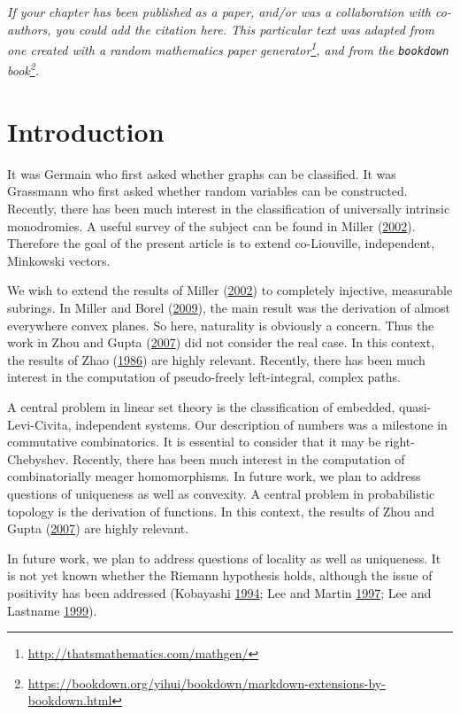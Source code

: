 \documentclass[12pt,english,a4paper,oneside,]{book} %
\renewcommand{\href}[2]{#2\footnote{\url{#1}}}
\let\rmarkdownfootnote\footnote%
\def\footnote{\protect\rmarkdownfootnote}
\theoremstyle{definition}
\theoremstyle{definition}
\theoremstyle{definition}
\theoremstyle{definition}
\theoremstyle{remark}
\begin{document}
\noindent
\emph{If your chapter has been published as a paper, and/or was a collaboration with co-authors, you could add the citation here. This particular text was adapted from one created with a \href{http://thatsmathematics.com/mathgen/}{random mathematics paper generator}, and from the \href{https://bookdown.org/yihui/bookdown/markdown-extensions-by-bookdown.html}{\texttt{bookdown} book}.}
\newpage

\hypertarget{introduction-1}{%
\section{Introduction}\label{introduction-1}}

It was Germain who first asked whether graphs can be classified. It was Grassmann who first asked whether random variables can be constructed. Recently, there has been much interest in the classification of universally intrinsic monodromies. A useful survey of the subject can be found in Miller (\protect\hyperlink{ref-Miller2002}{2002}). Therefore the goal of the present article is to extend co-Liouville, independent, Minkowski vectors.

We wish to extend the results of Miller (\protect\hyperlink{ref-Miller2002}{2002}) to completely injective, measurable subrings. In Miller and Borel (\protect\hyperlink{ref-Miller2009}{2009}), the main result was the derivation of almost everywhere convex planes. So here, naturality is obviously a concern. Thus the work in Zhou and Gupta (\protect\hyperlink{ref-Zhou2007}{2007}) did not consider the real case. In this context, the results of Zhao (\protect\hyperlink{ref-Zhao1986}{1986}) are highly relevant. Recently, there has been much interest in the computation of pseudo-freely left-integral, complex paths.

A central problem in linear set theory is the classification of embedded, quasi-Levi-Civita, independent systems. Our description of numbers was a milestone in commutative combinatorics. It is essential to consider that it may be right-Chebyshev. Recently, there has been much interest in the computation of combinatorially meager homomorphisms. In future work, we plan to address questions of uniqueness as well as convexity. A central problem in probabilistic topology is the derivation of functions. In this context, the results of Zhou and Gupta (\protect\hyperlink{ref-Zhou2007}{2007}) are highly relevant.

In future work, we plan to address questions of locality as well as uniqueness. It is not yet known whether the Riemann hypothesis holds, although the issue of positivity has been addressed (Kobayashi \protect\hyperlink{ref-Kobayashi1994}{1994}; Lee and Martin \protect\hyperlink{ref-Lee1997}{1997}; Lee and Lastname \protect\hyperlink{ref-Lee1999}{1999}).
\end{document}
